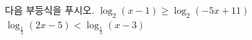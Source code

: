 다음 부등식을 푸시오.
 $\log_2 (x-1)\ge\log_2 (-5x+11)$
 $\log_{\frac{1}{3}} (2x-5)<\log_{\frac{1}{3}} (x-3)$
